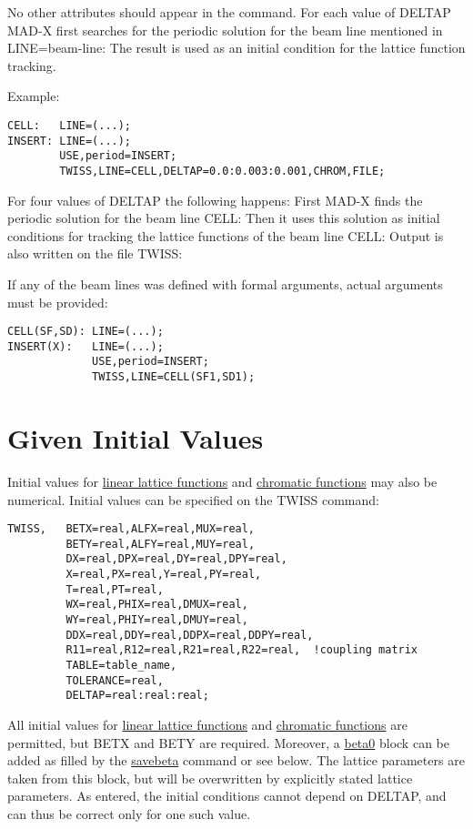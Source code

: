 No other attributes should appear in the command. For each value of
DELTAP MAD-X first searches for the periodic solution for the beam line
mentioned in LINE=beam-line: The result is used as an initial condition
for the lattice function tracking. 

Example: 
\begin{verbatim}
CELL:   LINE=(...);
INSERT: LINE=(...);
        USE,period=INSERT;
        TWISS,LINE=CELL,DELTAP=0.0:0.003:0.001,CHROM,FILE;
\end{verbatim}

For four values of DELTAP the following happens: First MAD-X finds the
periodic solution for the beam line CELL: Then it uses this solution as
initial conditions for tracking the lattice functions of the beam line
CELL: Output is also written on the file TWISS:  

If any of the beam lines was defined with formal arguments, actual
arguments must be provided:  
\begin{verbatim}
CELL(SF,SD): LINE=(...);
INSERT(X):   LINE=(...);
             USE,period=INSERT;
             TWISS,LINE=CELL(SF1,SD1);
\end{verbatim}

\section{Given Initial Values}

Initial values for \href{../Introduction/tables.html#linear}{linear
  lattice functions} and
\href{../Introduction/tables.html#chrom}{chromatic functions} may also
be numerical. Initial values can be specified on the TWISS command:  
\begin{verbatim}
TWISS,   BETX=real,ALFX=real,MUX=real,
         BETY=real,ALFY=real,MUY=real,
         DX=real,DPX=real,DY=real,DPY=real,
         X=real,PX=real,Y=real,PY=real,
         T=real,PT=real,
         WX=real,PHIX=real,DMUX=real,
         WY=real,PHIY=real,DMUY=real,
         DDX=real,DDY=real,DDPX=real,DDPY=real,
         R11=real,R12=real,R21=real,R22=real,  !coupling matrix
         TABLE=table_name,
         TOLERANCE=real,
         DELTAP=real:real:real;
\end{verbatim}

All initial values for \href{../Introduction/tables.html#linear}{linear
  lattice functions} and
\href{../Introduction/tables.html#chrom}{chromatic functions} are
permitted, but BETX and BETY are required. Moreover, a
\href{beta0}{beta0} block can be added as filled by the
\href{../control/general.html#savebeta}{savebeta} command or see
below. The lattice parameters are taken from this block, but will be
overwritten by explicitly stated lattice parameters. As entered, the
initial conditions cannot depend on DELTAP, and can thus be correct only
for one such value.  

